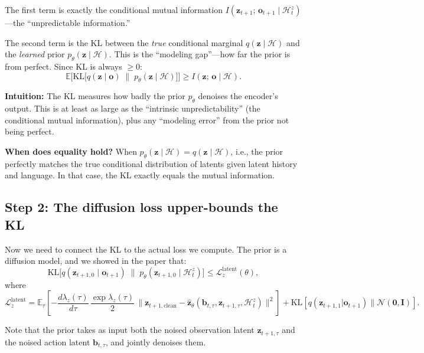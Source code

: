 \documentclass{article}
\newcommand{\vo}{\bm{o}}
\newcommand{\vz}{\bm{z}}
\newcommand{\vb}{\bm{b}}
\newcommand{\loss}{\mathcal{L}}
\newcommand{\E}{\mathbb{E}}
\newcommand{\KL}{\mathrm{KL}}
\begin{document}
The first term is exactly the conditional mutual information $I(\vz_{t+1};\, \vo_{t+1} \mid \mathcal{H}_t^z)$---the ``unpredictable information.''

The second term is the KL between the \emph{true} conditional marginal $q(\vz \mid \mathcal{H})$ and the \emph{learned} prior $p_\theta(\vz \mid \mathcal{H})$. This is the ``modeling gap''---how far the prior is from perfect. Since KL is always $\geq 0$:
\begin{equation}
  \boxed{\E\Big[\KL\!\big[q(\vz \mid \vo) \;\|\; p_\theta(\vz \mid \mathcal{H})\big]\Big] \geq I(\vz;\, \vo \mid \mathcal{H}).}
  \label{eq:kl_geq_mi}
\end{equation}

\textbf{Intuition:} The KL measures how badly the prior $p_\theta$ denoises the encoder's output. This is at least as large as the ``intrinsic unpredictability'' (the conditional mutual information), plus any ``modeling error'' from the prior not being perfect.

\textbf{When does equality hold?} When $p_\theta(\vz \mid \mathcal{H}) = q(\vz \mid \mathcal{H})$, i.e., the prior perfectly matches the true conditional distribution of latents given latent history and language. In that case, the KL exactly equals the mutual information.

\subsection{Step 2: The diffusion loss upper-bounds the KL}

Now we need to connect the KL to the actual loss we compute. The prior is a diffusion model, and we showed in the paper that:
\begin{equation}
  \KL\!\big[q(\vz_{t+1,0} \mid \vo_{t+1}) \;\|\; p_\theta(\vz_{t+1,0} \mid \mathcal{H}_t^z)\big]
  \leq \loss_z^{\text{latent}}(\theta),
  \label{eq:diff_bound}
\end{equation}
where
\begin{equation}
  \loss_z^{\text{latent}} = \E_{\tau}\!\left[-\frac{d\lambda_z(\tau)}{d\tau}\,\frac{\exp\lambda_z(\tau)}{2}\,\|\vz_{t+1,\text{clean}} - \hat{\vz}_\theta(\vb_{t,\tau}, \vz_{t+1,\tau}, \mathcal{H}_t^z)\|^2\right] + \KL[q(\vz_{t+1,1}|\vo_{t+1}) \| \mathcal{N}(\bm{0},\bm{I})].
\end{equation}

Note that the prior takes as input both the noised observation latent $\vz_{t+1,\tau}$ and the noised action latent $\vb_{t,\tau}$, and jointly denoises them.
\end{document}
